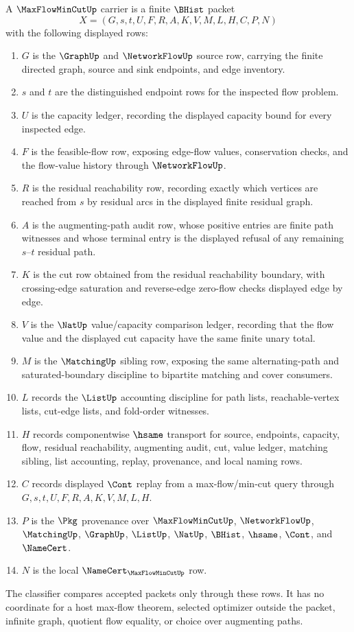 \begin{definition}
\label{def:max-flow-min-cut-carrier}
A $\MaxFlowMinCutUp$ carrier is a finite $\BHist$ packet
$$
X=(G,s,t,U,F,R,A,K,V,M,L,H,C,P,N)
$$
with the following displayed rows:
\begin{enumerate}
\item $G$ is the $\GraphUp$ and $\NetworkFlowUp$ source row, carrying the finite directed graph, source and sink endpoints, and edge inventory.
\item $s$ and $t$ are the distinguished endpoint rows for the inspected flow problem.
\item $U$ is the capacity ledger, recording the displayed capacity bound for every inspected edge.
\item $F$ is the feasible-flow row, exposing edge-flow values, conservation checks, and the flow-value history through $\NetworkFlowUp$.
\item $R$ is the residual reachability row, recording exactly which vertices are reached from $s$ by residual arcs in the displayed finite residual graph.
\item $A$ is the augmenting-path audit row, whose positive entries are finite path witnesses and whose terminal entry is the displayed refusal of any remaining $s$--$t$ residual path.
\item $K$ is the cut row obtained from the residual reachability boundary, with crossing-edge saturation and reverse-edge zero-flow checks displayed edge by edge.
\item $V$ is the $\NatUp$ value/capacity comparison ledger, recording that the flow value and the displayed cut capacity have the same finite unary total.
\item $M$ is the $\MatchingUp$ sibling row, exposing the same alternating-path and saturated-boundary discipline to bipartite matching and cover consumers.
\item $L$ records the $\ListUp$ accounting discipline for path lists, reachable-vertex lists, cut-edge lists, and fold-order witnesses.
\item $H$ records componentwise $\hsame$ transport for source, endpoints, capacity, flow, residual reachability, augmenting audit, cut, value ledger, matching sibling, list accounting, replay, provenance, and local naming rows.
\item $C$ records displayed $\Cont$ replay from a max-flow/min-cut query through $G,s,t,U,F,R,A,K,V,M,L,H$.
\item $P$ is the $\Pkg$ provenance over $\MaxFlowMinCutUp$, $\NetworkFlowUp$, $\MatchingUp$, $\GraphUp$, $\ListUp$, $\NatUp$, $\BHist$, $\hsame$, $\Cont$, and $\NameCert$.
\item $N$ is the local $\NameCert_{\MaxFlowMinCutUp}$ row.
\end{enumerate}
The classifier compares accepted packets only through these rows. It has no coordinate for a host max-flow theorem, selected optimizer outside the packet, infinite graph, quotient flow equality, or choice over augmenting paths.
\end{definition}


